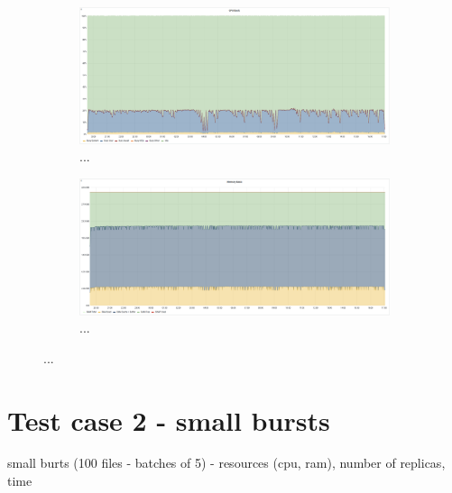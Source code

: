 \begin{figure}[H]
    \begin{subfigure}[h]{0.5\linewidth}
        \centering
        \includegraphics[width=1\linewidth]{other-fig/tests/cdf_cpu.png}
        \caption{...}
    \end{subfigure}
    \hfill
    \begin{subfigure}[h]{0.5\linewidth}
        \centering
        \includegraphics[width=1\linewidth]{other-fig/tests/cdf_ram.png}
        \caption{...}
    \end{subfigure}
    \caption{...}
\end{figure}

\section{Test case 2 - small bursts}
small burts (100 files - batches of 5) - resources (cpu, ram), number of replicas, time

